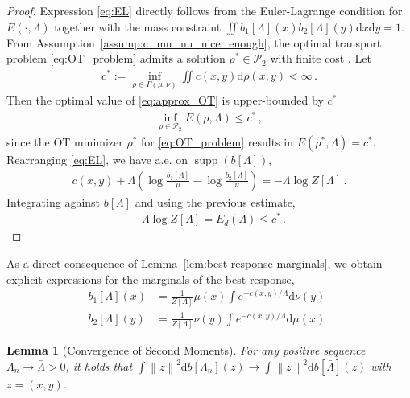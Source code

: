 \documentclass[11pt,a4paper,final]{article}
\DeclareMathOperator{\supp}{supp}
\def\P{\mathcal P}
\renewcommand{\d}{\mathrm{d}}
\newcommand{\norm}[1]{\left\lVert#1\right\rVert}
\newcommand{\1}{\mathbf{1}}
\theoremstyle{plain}
\newtheorem{lemma}[theorem]{Lemma}
\numberwithin{equation}{section}
\numberwithin{theorem}{section}
\begin{document}
\begin{proof}
  Expression \eqref{eq:EL} directly follows from the Euler-Lagrange condition  for $E(\cdot,\Lambda)$ together with the mass constraint $\iint b_1[\Lambda](x)b_2[\Lambda](y)\d x\d y=1$. 
     From Assumption~\ref{assump:c_mu_nu_nice_enough}, the optimal transport problem \eqref{eq:OT_problem} admits a solution $\rho^*\in\P_2$ with finite cost \cite[Ch 6]{ags}. Let
    \begin{align*}
        c^* :=\inf_{\rho\in\Gamma(\mu,\nu)} \iint c(x,y) \d \rho(x,y)<\infty\,.
    \end{align*}
    Then the optimal value of \eqref{eq:approx_OT} is upper-bounded by $c^*$
    \begin{align*}
        \inf_{\rho\in\P_2} E(\rho,\Lambda) \le c^*\,,
    \end{align*}
    since the OT minimizer $\rho^*$ for \eqref{eq:OT_problem} results in $E(\rho^*,\Lambda)=c^*$.
 Rearranging \eqref{eq:EL}, we have a.e. on $\supp(b[\Lambda])$,
 \begin{align*}
     c(x,y)+\Lambda\left(\log\frac{b_1[\Lambda]}{\mu}+\log\frac{b_2[\Lambda]}{\nu}\right)=-\Lambda\log Z[\Lambda]\,.
 \end{align*}
 Integrating against $b[\Lambda]$ and using the previous estimate,
 \begin{align*}
    -\Lambda\log Z[\Lambda]=E_d(\Lambda)\le c^*\,. 
 \end{align*}
\end{proof}
As a direct consequence of Lemma~\ref{lem:best-response-marginals}, we obtain explicit expressions for the marginals of the best response,
\begin{align}
        b_1[\Lambda](x) &= \frac{1}{Z[\Lambda]}\mu(x)\int e^{-c(x,y)/\Lambda} \d \nu(y)
        \label{eq:best-response-marginal-mu}\\
        b_2[\Lambda](y) &= \frac{1}{Z[\Lambda]}\nu(y) \int e^{-c(x,y)/\Lambda} \d \mu(x)\,.
        \label{eq:best-response-marginal-nu}
    \end{align}  
\begin{lemma}[Convergence of Second Moments]\label{lem:cv_second_moments}
    For any positive sequence $\Lambda_n \rightarrow \bar \Lambda>0$, it holds that $\int \norm{z}^2 \d b[\Lambda_n](z) \rightarrow \int  \norm{z}^2\d b[\bar\Lambda](z)$ with $z=(x,y)$.
\end{lemma}
\end{document}
